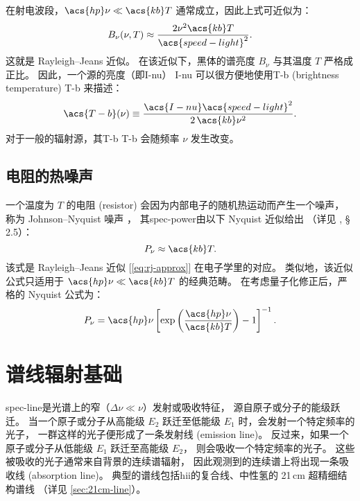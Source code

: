 在射电波段，$\acs{hp}\nu \ll \acs{kb}T$ 通常成立，因此上式可近似为：
\begin{equation}
  \label{eq:rj-approx}
  B_{\nu}(\nu, T)
    \approx \frac{2 \nu^2 \acs{kb} T}{\acs{speed-light}^2} .
\end{equation}
这就是 Rayleigh--Jeans 近似。
在该近似下，黑体的谱亮度 $B_{\nu}$ 与其温度 $T$ 严格成正比。
因此，一个源的亮度（即\acl{I-nu}） \ac{I-nu}
可以很方便地使用\acl{T-b} (brightness temperature) \ac{T-b} 来描述：
\begin{equation}
  \label{eq:Tb}
  \acs{T-b}(\nu)
    \equiv \frac{\acs{I-nu} \acs{speed-light}^2}{2 \,\acs{kb} \nu^2} .
\end{equation}
对于一般的辐射源，其\acl{T-b} \ac{T-b} 会随频率 $\nu$ 发生改变。

\subsection{电阻的热噪声}

一个温度为 $T$ 的电阻 (resistor) 会因为内部电子的随机热运动而产生一个噪声，
称为 Johnson--Nyquist 噪声 \cite{johnson1928,nyquist1928}，
其\ac{spec-power}由以下 Nyquist 近似给出
（详见 , \S\,2.5）：
\begin{equation}
  \label{eq:nyquist-approx}
  P_{\nu} \approx \acs{kb} T .
\end{equation}
该式是 Rayleigh--Jeans 近似 [\autoref{eq:rj-approx}] 在电子学里的对应。
类似地，该近似公式只适用于 $\acs{hp}\nu \ll \acs{kb}T$ 的经典范畴。
在考虑量子化修正后，严格的 Nyquist 公式为：
\begin{equation}
  \label{eq:nyquist}
  P_{\nu} = \acs{hp} \nu
    \left[ \exp\left( \frac{\acs{hp} \nu}{\acs{kb} T} \right) - 1 \right]^{-1} .
\end{equation}


\section{谱线辐射基础}
\label{sec:spectral-line}

\acf{spec-line}是光谱上的窄（$\Delta\nu \ll \nu$）发射或吸收特征，
源自原子或分子的能级跃迁。
当一个原子或分子从高能级 $E_2$ 跃迁至低能级 $E_1$ 时，会发射一个特定频率的光子，
一群这样的光子便形成了一条发射线 (emission line)。
反过来，如果一个原子或分子从低能级 $E_1$ 跃迁至高能级 $E_2$，
则会吸收一个特定频率的光子。
这些被吸收的光子通常来自背景的连续谱辐射，
因此观测到的连续谱上将出现一条吸收线 (absorption line)。
典型的谱线包括\ac{hii}的复合线、中性氢的 21\,cm 超精细结构谱线
（详见 \autoref{sec:21cm-line}）。


